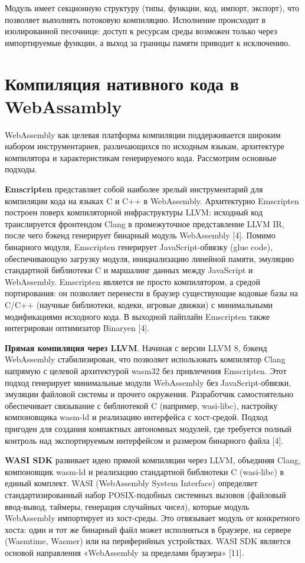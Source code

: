 \documentclass[12pt, oneside]{book}
\begin{document}
    \quad Модуль имеет секционную структуру (типы, функции, код, импорт, экспорт), что позволяет выполнять потоковую компиляцию. Исполнение происходит в изолированной песочнице: доступ к ресурсам среды возможен только через импортируемые функции, а выход за границы памяти приводит к исключению.

\section{Компиляция нативного кода в WebAssambly}
    \quad WebAssembly как целевая платформа компиляции поддерживается широким набором инструментариев, различающихся по исходным языкам, архитектуре компилятора и характеристикам генерируемого кода. Рассмотрим основные подходы.
    
    \quad \textbf{Emscripten} представляет собой наиболее зрелый инструментарий для компиляции кода на языках C и C++ в WebAssembly. Архитектурно Emscripten построен поверх компиляторной инфраструктуры LLVM: исходный код транслируется фронтендом Clang в промежуточное представление LLVM IR, после чего бэкенд генерирует бинарный модуль WebAssembly [4]. Помимо бинарного модуля, Emscripten генерирует JavaScript-обвязку (glue code), обеспечивающую загрузку модуля, инициализацию линейной памяти, эмуляцию стандартной библиотеки C и маршалинг данных между JavaScript и WebAssembly. Emscripten является не просто компилятором, а средой портирования: он позволяет перенести в браузер существующие кодовые базы на C/C++ (научные библиотеки, кодеки, игровые движки) с минимальными модификациями исходного кода. В выходной пайплайн Emscripten также интегрирован оптимизатор Binaryen [4].
    
    \quad \textbf{Прямая компиляция через LLVM}. Начиная с версии LLVM 8, бэкенд WebAssembly стабилизирован, что позволяет использовать компилятор Clang напрямую с целевой архитектурой wasm32 без привлечения Emscripten. Этот подход генерирует минимальные модули WebAssembly без JavaScript-обвязки, эмуляции файловой системы и прочего окружения. Разработчик самостоятельно обеспечивает связывание с библиотекой C (например, wasi-libc), настройку компоновщика wasm-ld и реализацию интерфейса с хост-средой. Подход пригоден для создания компактных автономных модулей, где требуется полный контроль над экспортируемым интерфейсом и размером бинарного файла [4].
    
    \quad \textbf{WASI SDK} развивает идею прямой компиляции через LLVM, объединяя Clang, компоновщик wasm-ld и реализацию стандартной библиотеки C (wasi-libc) в единый комплект. WASI (WebAssembly System Interface) определяет стандартизированный набор POSIX-подобных системных вызовов (файловый ввод-вывод, таймеры, генерация случайных чисел), которые модуль WebAssembly импортирует из хост-среды. Это отвязывает модуль от конкретного хоста: один и тот же бинарный файл может исполняться в браузере, на сервере (Wasmtime, Wasmer) или на периферийных устройствах. WASI SDK является основой направления «WebAssembly за пределами браузера» [11].
    
\end{document}
